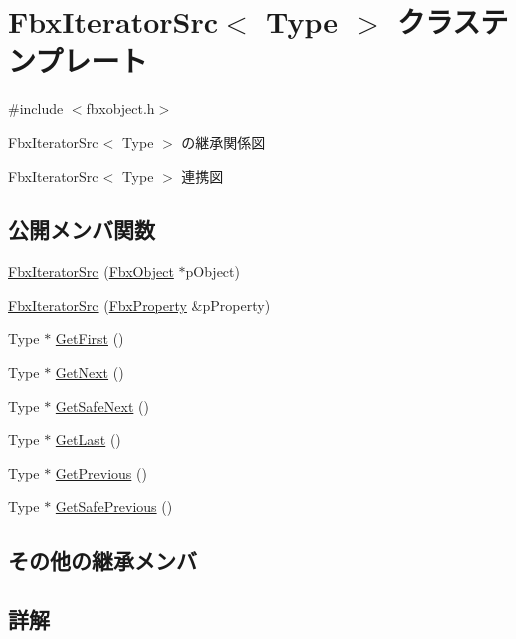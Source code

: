 \hypertarget{class_fbx_iterator_src}{}\section{Fbx\+Iterator\+Src$<$ Type $>$ クラステンプレート}
\label{class_fbx_iterator_src}


{\ttfamily \#include $<$fbxobject.\+h$>$}



Fbx\+Iterator\+Src$<$ Type $>$ の継承関係図


Fbx\+Iterator\+Src$<$ Type $>$ 連携図
\subsection*{公開メンバ関数}
\begin{DoxyCompactItemize}
\item 
\hyperlink{class_fbx_iterator_src_ad3a24f4ca3fe6adc2178e694e0ecd316}{Fbx\+Iterator\+Src} (\hyperlink{class_fbx_object}{Fbx\+Object} $\ast$p\+Object)
\item 
\hyperlink{class_fbx_iterator_src_a5982990c1de3efa6145b49ffcf129d39}{Fbx\+Iterator\+Src} (\hyperlink{class_fbx_property}{Fbx\+Property} \&p\+Property)
\item 
Type $\ast$ \hyperlink{class_fbx_iterator_src_aef5d6205bcb4f41501f5a1ec1765182c}{Get\+First} ()
\item 
Type $\ast$ \hyperlink{class_fbx_iterator_src_a04efb028369a31d5a822c3b2a7e23b16}{Get\+Next} ()
\item 
Type $\ast$ \hyperlink{class_fbx_iterator_src_a530db83b2a4c20190bcdc7b7a9af2811}{Get\+Safe\+Next} ()
\item 
Type $\ast$ \hyperlink{class_fbx_iterator_src_a44c9746ef3d04a0993781dfea8ac7142}{Get\+Last} ()
\item 
Type $\ast$ \hyperlink{class_fbx_iterator_src_a8b7703e63be49c3210f5a71946437027}{Get\+Previous} ()
\item 
Type $\ast$ \hyperlink{class_fbx_iterator_src_adc197165ab59e507a6aa84283c0a821b}{Get\+Safe\+Previous} ()
\end{DoxyCompactItemize}
\subsection*{その他の継承メンバ}


\subsection{詳解}
